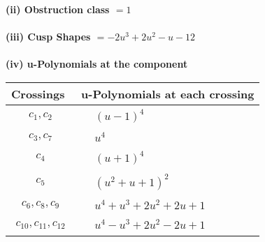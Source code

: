 \documentclass[1p]{elsarticle_modified}
\theoremstyle{definition}
\begin{document}
\flushleft \textbf{(ii) Obstruction class $= 1$}\\~\\
\flushleft \textbf{(iii) Cusp Shapes $= -2 u^3+2 u^2- u-12$}\\~\\
\newpage\renewcommand{\arraystretch}{1}
\flushleft \textbf{(iv) u-Polynomials at the component}\newline \\
\begin{tabular}{m{50pt}|m{274pt}}
Crossings & \hspace{64pt}u-Polynomials at each crossing \\
\hline $$\begin{aligned}c_{1},c_{2}\end{aligned}$$&$\begin{aligned}
&(u-1)^4
\end{aligned}$\\
\hline $$\begin{aligned}c_{3},c_{7}\end{aligned}$$&$\begin{aligned}
&u^4
\end{aligned}$\\
\hline $$\begin{aligned}c_{4}\end{aligned}$$&$\begin{aligned}
&(u+1)^4
\end{aligned}$\\
\hline $$\begin{aligned}c_{5}\end{aligned}$$&$\begin{aligned}
&(u^2+u+1)^2
\end{aligned}$\\
\hline $$\begin{aligned}c_{6},c_{8},c_{9}\end{aligned}$$&$\begin{aligned}
&u^4+u^3+2 u^2+2 u+1
\end{aligned}$\\
\hline $$\begin{aligned}c_{10},c_{11},c_{12}\end{aligned}$$&$\begin{aligned}
&u^4- u^3+2 u^2-2 u+1
\end{aligned}$\\
\hline
\end{tabular}\\~\\
\end{document}
